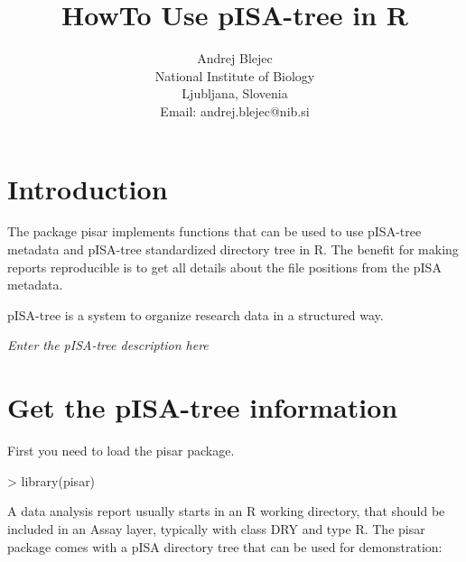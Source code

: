 \documentclass[a4paper,12pt]{article}\usepackage[]{graphicx}\usepackage[]{color}
\makeatletter
\providecommand\code{\bgroup\@codex}
\def\@codex#1{{\normalfont\ttfamily\hyphenchar\font=-1  #1}\egroup}
\providecommand{\strong}[1]{{\normalfont\fontseries{b}\selectfont  #1}}
\let\pkg=\strong
\makeatother
\begin{document}
\title{HowTo Use pISA-tree in R}
\author{Andrej Blejec\\
National Institute of Biology\\
Ljubljana, Slovenia\\
\small{Email: \code{andrej.blejec@nib.si}}
}%
%

\maketitle
\tableofcontents



\section{Introduction}
The package \pkg{pisar} implements functions that can be used to
use pISA-tree metadata and pISA-tree standardized directory tree in R.
The benefit for making reports reproducible is to get all details about the
file positions from the pISA metadata.

pISA-tree is a system to organize research data in a structured way.

\emph{Enter the pISA-tree description here}

\section{Get the pISA-tree information}

First you need to load the \pkg{pisar} package.

\begin{Schunk}
\begin{Sinput}
> library(pisar)
\end{Sinput}
\end{Schunk}

A data analysis report usually starts in an R working directory, that should be included in an Assay layer, typically with class \code{DRY} and type \code{R}.
The \pkg{pisar} package comes with a pISA directory tree that can be
used for demonstration:
\end{document}
